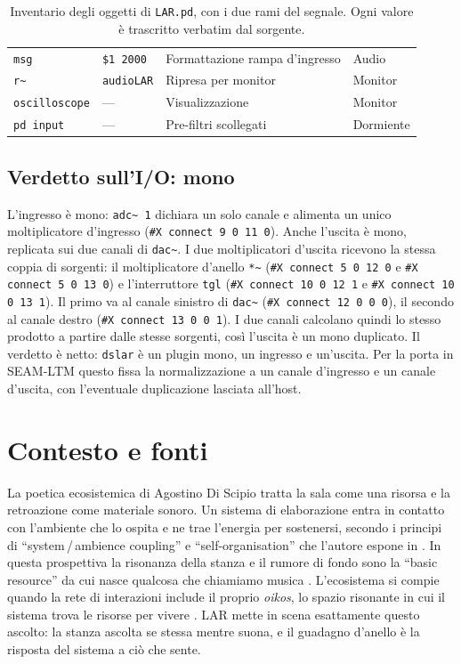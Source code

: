 \documentclass[11pt,a4paper]{article}
\begin{document}
\begin{table}[htbp]
\begin{tabular}{@{}llll@{}}
\texttt{msg} & \texttt{\$1 2000} & Formattazione rampa d'ingresso & Audio \\
\texttt{r\textasciitilde{}} & \texttt{audioLAR} & Ripresa per monitor & Monitor \\
\texttt{oscilloscope} & --- & Visualizzazione & Monitor \\
\texttt{pd input} & --- & Pre-filtri scollegati & Dormiente \\
\bottomrule
\end{tabular}
\caption{Inventario degli oggetti di \texttt{LAR.pd}, con i due rami del segnale. Ogni valore è trascritto verbatim dal sorgente.}
\label{tab:inventario}
\end{table}

\subsection{Verdetto sull'I/O: mono}
L'ingresso è mono: \texttt{adc\textasciitilde{} 1} dichiara un solo canale e alimenta un unico moltiplicatore d'ingresso (\texttt{\#X connect 9 0 11 0}).
Anche l'uscita è mono, replicata sui due canali di \texttt{dac\textasciitilde{}}.
I due moltiplicatori d'uscita ricevono la stessa coppia di sorgenti: il moltiplicatore d'anello \texttt{*\textasciitilde{}} (\texttt{\#X connect 5 0 12 0} e \texttt{\#X connect 5 0 13 0}) e l'interruttore \texttt{tgl} (\texttt{\#X connect 10 0 12 1} e \texttt{\#X connect 10 0 13 1}).
Il primo va al canale sinistro di \texttt{dac\textasciitilde{}} (\texttt{\#X connect 12 0 0 0}), il secondo al canale destro (\texttt{\#X connect 13 0 0 1}).
I due canali calcolano quindi lo stesso prodotto a partire dalle stesse sorgenti, così l'uscita è un mono duplicato.
Il verdetto è netto: \texttt{dslar} è un plugin mono, un ingresso e un'uscita.
Per la porta in SEAM-LTM questo fissa la normalizzazione a un canale d'ingresso e un canale d'uscita, con l'eventuale duplicazione lasciata all'host.

\section{Contesto e fonti}\label{sec:contesto}
La poetica ecosistemica di Agostino Di Scipio tratta la sala come una risorsa e la retroazione come materiale sonoro.
Un sistema di elaborazione entra in contatto con l'ambiente che lo ospita e ne trae l'energia per sostenersi, secondo i principi di ``system\,/\,ambience coupling'' e ``self-organisation'' che l'autore espone in \cite{discipio2003ecosystemics}.
In questa prospettiva la risonanza della stanza e il rumore di fondo sono la ``basic resource'' da cui nasce qualcosa che chiamiamo musica \cite{discipio2011background}.
L'ecosistema si compie quando la rete di interazioni include il proprio \emph{oikos}, lo spazio risonante in cui il sistema trova le risorse per vivere \cite{discipio2011background}.
LAR mette in scena esattamente questo ascolto: la stanza ascolta se stessa mentre suona, e il guadagno d'anello è la risposta del sistema a ciò che sente.
\end{document}

